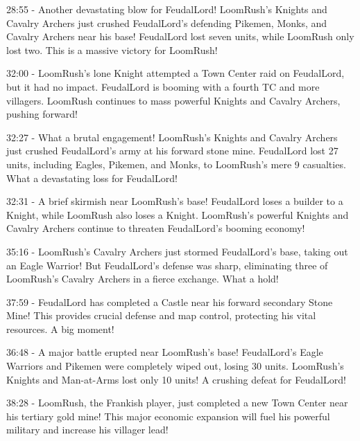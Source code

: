 28:55 - Another devastating blow for FeudalLord! LoomRush's Knights and Cavalry Archers just crushed FeudalLord's defending Pikemen, Monks, and Cavalry Archers near his base! FeudalLord lost seven units, while LoomRush only lost two. This is a massive victory for LoomRush! \par \vspace{1em}

32:00 - LoomRush's lone Knight attempted a Town Center raid on FeudalLord, but it had no impact. FeudalLord is booming with a fourth TC and more villagers. LoomRush continues to mass powerful Knights and Cavalry Archers, pushing forward! \par \vspace{1em}

32:27 - What a brutal engagement! LoomRush's Knights and Cavalry Archers just crushed FeudalLord's army at his forward stone mine. FeudalLord lost 27 units, including Eagles, Pikemen, and Monks, to LoomRush's mere 9 casualties. What a devastating loss for FeudalLord! \par \vspace{1em}

32:31 - A brief skirmish near LoomRush's base! FeudalLord loses a builder to a Knight, while LoomRush also loses a Knight. LoomRush's powerful Knights and Cavalry Archers continue to threaten FeudalLord's booming economy! \par \vspace{1em}

35:16 - LoomRush’s Cavalry Archers just stormed FeudalLord’s base, taking out an Eagle Warrior! But FeudalLord's defense was sharp, eliminating three of LoomRush's Cavalry Archers in a fierce exchange. What a hold! \par \vspace{1em}

37:59 - FeudalLord has completed a Castle near his forward secondary Stone Mine! This provides crucial defense and map control, protecting his vital resources. A big moment! \par \vspace{1em}

36:48 - A major battle erupted near LoomRush's base! FeudalLord's Eagle Warriors and Pikemen were completely wiped out, losing 30 units. LoomRush's Knights and Man-at-Arms lost only 10 units! A crushing defeat for FeudalLord! \par \vspace{1em}

38:28 - LoomRush, the Frankish player, just completed a new Town Center near his tertiary gold mine! This major economic expansion will fuel his powerful military and increase his villager lead! \par \vspace{1em}

